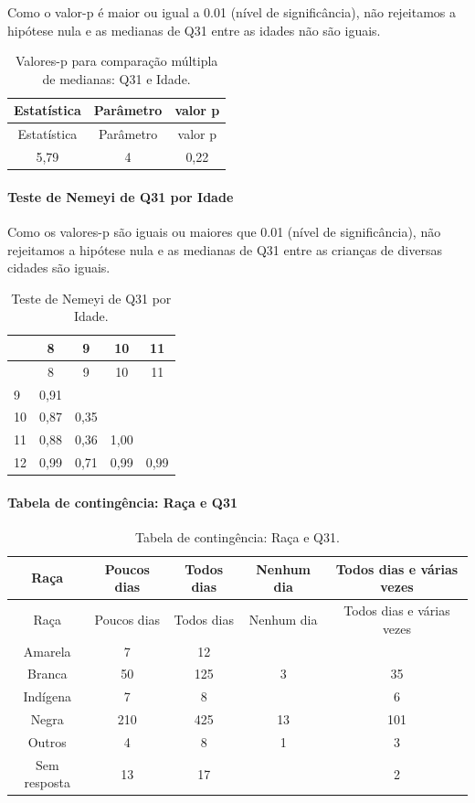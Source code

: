 \documentclass[]{article}
\let\oldparagraph\paragraph
\renewcommand{\paragraph}[1]{\oldparagraph{#1}\mbox{}}
\begin{document}
Como o valor-p é maior ou igual a 0.01 (nível de significância), não rejeitamos a hipótese nula e as medianas de Q31 entre as idades não são iguais.

\begin{longtable}[]{@{}ccc@{}}
\caption{\label{tab:unnamed-chunk-1042}Valores-p para comparação múltipla de medianas: Q31 e Idade.}\tabularnewline
\toprule
Estatística & Parâmetro & valor p\tabularnewline
\midrule
\endfirsthead
\toprule
Estatística & Parâmetro & valor p\tabularnewline
\midrule
\endhead
5,79 & 4 & 0,22\tabularnewline
\bottomrule
\end{longtable}

\hypertarget{teste-de-nemeyi-de-q31-por-idade}{%
\paragraph{Teste de Nemeyi de Q31 por Idade}\label{teste-de-nemeyi-de-q31-por-idade}}

Como os valores-p são iguais ou maiores que 0.01 (nível de significância), não rejeitamos a hipótese nula e as medianas de Q31 entre as crianças de diversas cidades são iguais.

\begin{longtable}[]{@{}lcccc@{}}
\caption{\label{tab:unnamed-chunk-1044}Teste de Nemeyi de Q31 por Idade.}\tabularnewline
\toprule
& 8 & 9 & 10 & 11\tabularnewline
\midrule
\endfirsthead
\toprule
& 8 & 9 & 10 & 11\tabularnewline
\midrule
\endhead
9 & 0,91 & & &\tabularnewline
10 & 0,87 & 0,35 & &\tabularnewline
11 & 0,88 & 0,36 & 1,00 &\tabularnewline
12 & 0,99 & 0,71 & 0,99 & 0,99\tabularnewline
\bottomrule
\end{longtable}

\cleardoublepage

\hypertarget{tabela-de-continguxeancia-rauxe7a-e-q31}{%
\paragraph{Tabela de contingência: Raça e Q31}\label{tabela-de-continguxeancia-rauxe7a-e-q31}}

\begin{longtable}[]{@{}ccccc@{}}
\caption{\label{tab:unnamed-chunk-1045}Tabela de contingência: Raça e Q31.}\tabularnewline
\toprule
Raça & Poucos dias & Todos dias & Nenhum dia & Todos dias e várias vezes\tabularnewline
\midrule
\endfirsthead
\toprule
Raça & Poucos dias & Todos dias & Nenhum dia & Todos dias e várias vezes\tabularnewline
\midrule
\endhead
Amarela & 7 & 12 & &\tabularnewline
Branca & 50 & 125 & 3 & 35\tabularnewline
Indígena & 7 & 8 & & 6\tabularnewline
Negra & 210 & 425 & 13 & 101\tabularnewline
Outros & 4 & 8 & 1 & 3\tabularnewline
Sem resposta & 13 & 17 & & 2\tabularnewline
\bottomrule
\end{longtable}
\end{document}
